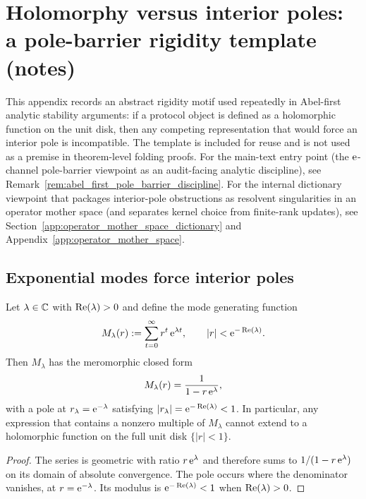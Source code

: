 \section{Holomorphy versus interior poles: a pole-barrier rigidity template (notes)}
\label{app:trace_pole_barrier_template}

\AuditTag This appendix records an abstract rigidity motif used repeatedly in Abel-first analytic stability arguments: if a protocol object is defined as a holomorphic function on the unit disk, then any competing representation that would force an interior pole is incompatible.
The template is included for reuse and is not used as a premise in theorem-level folding proofs.
For the main-text entry point (the $\mathrm{e}$-channel pole-barrier viewpoint as an audit-facing analytic discipline), see Remark~\ref{rem:abel_first_pole_barrier_discipline}.
\AuditTag For the internal dictionary viewpoint that packages interior-pole obstructions as resolvent singularities in an operator mother space (and separates kernel choice from finite-rank updates), see Section~\ref{app:operator_mother_space_dictionary} and Appendix~\ref{app:operator_mother_space}.

\subsection{Exponential modes force interior poles}
\label{subsec:interior_pole_from_exponential_mode}

\begin{lemma}
\label{lem:interior_pole_exponential_mode}
\MathTag Let $\lambda\in\mathbb{C}$ with $\operatorname{Re}(\lambda)>0$ and define the mode generating function
\[
M_\lambda(r):=\sum_{t=0}^{\infty} r^t\,\mathrm{e}^{\lambda t},
\qquad |r|<\mathrm{e}^{-\operatorname{Re}(\lambda)}.
\]
Then $M_\lambda$ has the meromorphic closed form
\[
M_\lambda(r)=\frac{1}{1-r\,\mathrm{e}^{\lambda}},
\]
with a pole at $r_\lambda=\mathrm{e}^{-\lambda}$ satisfying $|r_\lambda|=\mathrm{e}^{-\operatorname{Re}(\lambda)}<1$.
In particular, any expression that contains a nonzero multiple of $M_\lambda$ cannot extend to a holomorphic function on the full unit disk $\{|r|<1\}$.
\end{lemma}
\begin{proof}
The series is geometric with ratio $r\,\mathrm{e}^\lambda$ and therefore sums to $1/(1-r\,\mathrm{e}^\lambda)$ on its domain of absolute convergence.
The pole occurs where the denominator vanishes, at $r=\mathrm{e}^{-\lambda}$.
Its modulus is $\mathrm{e}^{-\operatorname{Re}(\lambda)}<1$ when $\operatorname{Re}(\lambda)>0$.
\end{proof}

